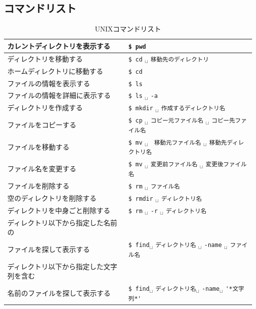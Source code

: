 \documentclass{jarticle}
\begin{document}
  \subsection*{コマンドリスト}
	  

\begin{table}[htbp]
  \caption{UNIXコマンドリスト} 
  \label{Tab:UNIXコマンドリスト}
  \begin{center}
     \begin{tabular}{ll}\toprule
      カレントディレクトリを表示する &
      \verb|$ pwd | \\ \midrule
      ディレクトリを移動する &
	  \verb|$ cd| $_\sqcup$ \verb|移動先のディレクトリ | \\ \midrule
      ホームディレクトリに移動する &
	  \verb|$ cd | \\ \midrule
      ファイルの情報を表示する &
	  \verb|$ ls | \\ \midrule
      ファイルの情報を詳細に表示する &
	  \verb|$ ls| $_\sqcup$ \verb|-a| \\ \midrule
      ディレクトリを作成する &
	  \verb|$ mkdir| $_\sqcup$ \verb|作成するディレクトリ名 | \\ \midrule
      ファイルをコピーする&
	  \verb|$ cp| $_\sqcup$ \verb|コピー元ファイル名| $_\sqcup$ \verb|コピー先ファイル名 | \\ \midrule
      ファイルを移動する &
	  \verb|$ mv| $_\sqcup$ \verb| 移動元ファイル名| $_\sqcup$ \verb|移動先ディレクトリ名 | \\ \midrule
     ファイル名を変更する&
	  \verb|$ mv| $_\sqcup$ \verb|変更前ファイル名| $_\sqcup$ \verb|変更後ファイル名 | \\ \midrule
      ファイルを削除する&
	  \verb|$ rm| $_\sqcup$ \verb|ファイル名 | \\ \midrule
      空のディレクトリを削除する&
	  \verb|$ rmdir| $_\sqcup$ \verb|ディレクトリ名 | \\ \midrule
      ディレクトリを中身ごと削除する &
	  \verb|$ rm| $_\sqcup$ \verb|-r| $_\sqcup$ \verb|ディレクトリ名| \\ \midrule
      ディレクトリ以下から指定した名前の\\
      ファイルを探して表示する &
	 \verb|$ find|$_\sqcup$ \verb|ディレクトリ名| $_\sqcup$ \verb|-name| $_\sqcup$ \verb|ファイル名 | \\ \midrule
      ディレクトリ以下から指定した文字列を含む\\
      名前のファイルを探して表示する &
	 \verb|$ find|$_\sqcup$ \verb|ディレクトリ名|$_\sqcup$ \verb|-name|$_\sqcup$ \verb|'*文字列*' | \\ \midrule

\end{tabular}
\end{center}
\end{table}
\end{document}
